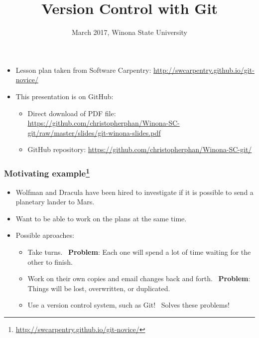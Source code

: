 \documentclass[aspectratio=1610]{beamer}
\newcommand{\correctans}{\textcolor{green!50!black}{\CheckmarkBold}}
\newcommand{\wrongans}{\textcolor{red!50!black}{\XSolidBold}}
\begin{document}
\begin{frame}
\title{Version Control with Git}
\date{March 2017, Winona State University}

\maketitle

\end{frame}

\begin{frame}

\begin{itemize}
  \item Lesson plan taken from Software Carpentry: \url{http://swcarpentry.github.io/git-novice/}
  \item This presentation is on GitHub:
  \begin{itemize}
\item Direct download of PDF file: \url{https://github.com/christopherphan/Winona-SC-git/raw/master/slides/git-winona-slides.pdf}
\item GitHub repository: \url{https://github.com/christopherphan/Winona-SC-git/}
\end{itemize}
\end{itemize}

\end{frame}

\begin{frame}
  \frametitle{Motivating example\footnote{\url{http://swcarpentry.github.io/git-novice/}}}
\begin{itemize}
\item  Wolfman and Dracula have been hired to investigate if it is possible to send a planetary lander to Mars. \pause
\item Want to be able to work on the plans at the same time.\pause
\item Possible aproaches: \pause
\begin{itemize} \item Take turns. \pause \textcolor{red!50!black}{\wrongans\ \textbf{Problem}: Each one will spend a lot of time waiting for the other to finish.} \pause
  \item Work on their own copies and email changes back and forth. \pause \textcolor{red!50!black}{\wrongans\ \textbf{Problem}: Things will be lost, overwritten, or duplicated.} \pause
\item Use a version control system, such as Git! \pause \textcolor{green!50!black}{\correctans\ Solves these problems!}
\end{itemize}
\end{itemize}
\end{frame}
\end{document}
